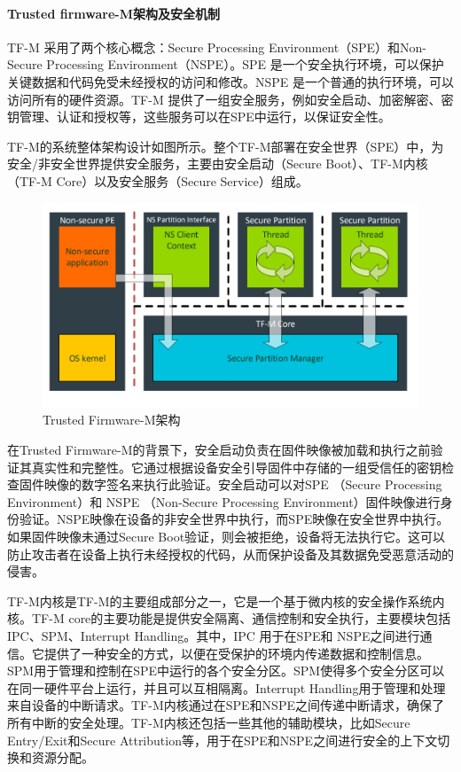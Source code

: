 \documentclass[12pt,a4paper]{ctexart}
\numberwithin{figure}{section}
\begin{document}
\paragraph{Trusted firmware-M架构及安全机制}
\par TF-M 采用了两个核心概念：Secure Processing Environment（SPE）和Non-Secure Processing Environment（NSPE）。SPE 是一个安全执行环境，可以保护关键数据和代码免受未经授权的访问和修改。NSPE 是一个普通的执行环境，可以访问所有的硬件资源。TF-M 提供了一组安全服务，例如安全启动、加密解密、密钥管理、认证和授权等，这些服务可以在SPE中运行，以保证安全性。
\par TF-M的系统整体架构设计如图所示。整个TF-M部署在安全世界（SPE）中，为安全/非安全世界提供安全服务，主要由安全启动（Secure Boot）、TF-M内核（TF-M Core）以及安全服务（Secure Service）组成。
\begin{figure}[h]
    \centering
    \includegraphics[scale=0.5]{graph/1.jpg}
    \caption{Trusted Firmware-M架构}
\end{figure}
\par 在Trusted Firmware-M的背景下，安全启动负责在固件映像被加载和执行之前验证其真实性和完整性。它通过根据设备安全引导固件中存储的一组受信任的密钥检查固件映像的数字签名来执行此验证。安全启动可以对SPE （Secure Processing Environment）和 NSPE （Non-Secure Processing Environment）固件映像进行身份验证。NSPE映像在设备的非安全世界中执行，而SPE映像在安全世界中执行。如果固件映像未通过Secure Boot验证，则会被拒绝，设备将无法执行它。这可以防止攻击者在设备上执行未经授权的代码，从而保护设备及其数据免受恶意活动的侵害。
\par TF-M内核是TF-M的主要组成部分之一，它是一个基于微内核的安全操作系统内核。TF-M core的主要功能是提供安全隔离、通信控制和安全执行，主要模块包括IPC、SPM、Interrupt Handling。其中，IPC 用于在SPE和 NSPE之间进行通信。它提供了一种安全的方式，以便在受保护的环境内传递数据和控制信息。SPM用于管理和控制在SPE中运行的各个安全分区。SPM使得多个安全分区可以在同一硬件平台上运行，并且可以互相隔离。Interrupt Handling用于管理和处理来自设备的中断请求。TF-M内核通过在SPE和NSPE之间传递中断请求，确保了所有中断的安全处理。TF-M内核还包括一些其他的辅助模块，比如Secure Entry/Exit和Secure Attribution等，用于在SPE和NSPE之间进行安全的上下文切换和资源分配。
\end{document}
